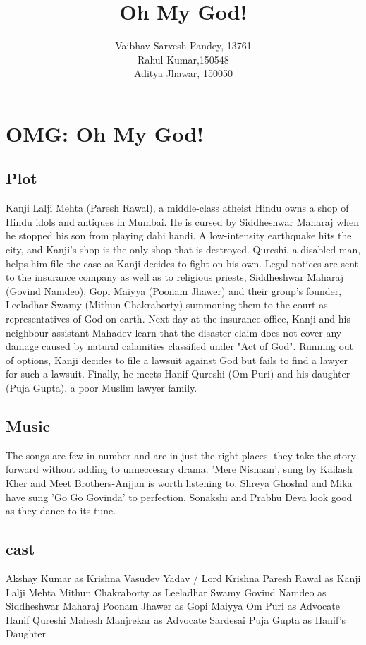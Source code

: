 \documentclass[a4paper]{article}
\title{Oh My God! }
\author{Vaibhav Sarvesh Pandey, 13761\\

	Rahul Kumar,150548\\
	Aditya Jhawar, 150050}
\begin{document}
	\maketitle
	

\section{OMG: Oh My God! }
\subsection{Plot}

Kanji Lalji Mehta (Paresh Rawal), a middle-class atheist Hindu owns a shop of Hindu idols and antiques in Mumbai. He is cursed by Siddheshwar Maharaj when he stopped his son from playing dahi handi. A low-intensity earthquake hits the city, and Kanji's shop is the only shop that is destroyed. Qureshi, a disabled man, helps him file the case as Kanji decides to fight on his own. Legal notices are sent to the insurance company as well as to religious priests, Siddheshwar Maharaj (Govind Namdeo), Gopi Maiyya (Poonam Jhawer) and their group's founder, Leeladhar Swamy (Mithun Chakraborty) summoning them to the court as representatives of God on earth.
Next day at the insurance office, Kanji and his neighbour-assistant Mahadev learn that the disaster claim does not cover any damage caused by natural calamities classified under "Act of God".   Running out of options, Kanji decides to file a lawsuit against God but fails to find a lawyer for such a lawsuit. Finally, he meets Hanif Qureshi (Om Puri) and his daughter (Puja Gupta), a poor Muslim lawyer family.
	
\subsection{Music }
The songs are few in number and are in just the right places. they take the story forward without adding to unneccesary drama. 'Mere Nishaan', sung by Kailash Kher and Meet Brothers-Anjjan is worth listening to. Shreya Ghoshal and Mika have sung 'Go Go Govinda' to perfection. Sonakshi and Prabhu Deva look good as they dance to its tune.   
  
	  \subsection{cast}
	        
Akshay Kumar as Krishna Vasudev Yadav / Lord Krishna
Paresh Rawal as Kanji Lalji Mehta
Mithun Chakraborty as Leeladhar Swamy
Govind Namdeo as Siddheshwar Maharaj
Poonam Jhawer as Gopi Maiyya
Om Puri as Advocate Hanif Qureshi
Mahesh Manjrekar as Advocate Sardesai
Puja Gupta as Hanif's Daughter                  
	  
\end{document}
